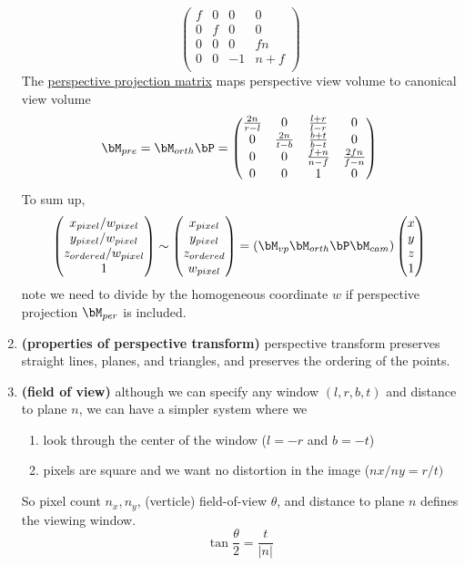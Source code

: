 \documentclass[11pt]{article}
\newcommand{\bheading}[1]{\textbf{(#1)}}
\begin{document}
\begin{enumerate}
\[\begin{pmatrix}
            f & 0 & 0 & 0 \\
            0 & f & 0 & 0 \\
            0 & 0 & 0 & fn \\
            0 & 0 & -1 & n+f \\
        \end{pmatrix}
    \]
    The \underline{perspective projection matrix} maps perspective view volume to canonical view volume
    \[
        \bM_{pre} = \bM_{orth} \bP = 
        \begin{pmatrix}
            \frac{2n}{r-l} & 0 & \frac{l+r}{l-r} & 0 \\
            0 & \frac{2n}{t-b} & \frac{b+t}{b-t} & 0 \\
            0 & 0 & \frac{f+n}{n-f} & \frac{2fn}{f-n} \\
            0 & 0 & 1 & 0 \\
        \end{pmatrix}
    \]
    To sum up,
    \[
        \begin{pmatrix}
            x_{pixel} / w_{pixel} \\
            y_{pixel} / w_{pixel} \\
            z_{ordered} / w_{pixel}\\ 
            1 \\
        \end{pmatrix}
        \sim
        \begin{pmatrix}
            x_{pixel} \\ y_{pixel} \\ z_{ordered} \\ w_{pixel}
        \end{pmatrix}
        = 
        (\bM_{vp} \bM_{orth} \bP \bM_{cam})
        \begin{pmatrix}
            x \\ y \\ z \\ 1
        \end{pmatrix}    
    \]
    note we need to divide by the homogeneous coordinate $w$ if perspective projection $\bM_{per}$ is included. 
    \item \bheading{properties of perspective transform} perspective transform preserves straight lines, planes, and triangles, and preserves the ordering of the points.
    \item \bheading{field of view} although we can specify any window $(l,r,b,t)$ and distance to plane $n$, we can have a simpler system where we 
    \begin{enumerate}
        \item look through the center of the window ($l=-r$ and $b=-t$)
        \item pixels are square and we want no distortion in the image ($nx / ny = r / t)$
    \end{enumerate}
    So pixel count $n_x, n_y$, (verticle) field-of-view $\theta$, and distance to plane $n$ defines the viewing window.
    \[
        \tan \frac{\theta}{2} = \frac{t}{|n|}    
    \]
\end{enumerate}
\end{document}
